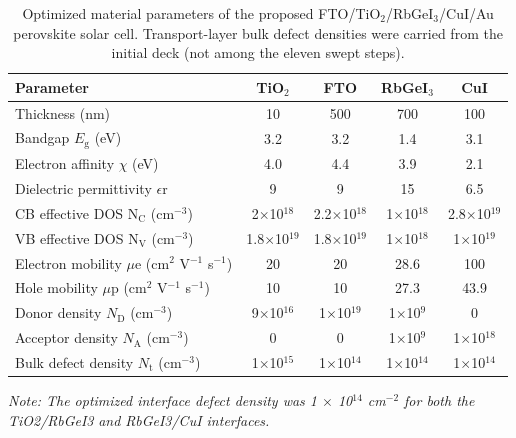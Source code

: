 \documentclass[review]{elsarticle}
\begin{document}
\begin{table}[htbp]
\centering
{\footnotesize\setlength{\tabcolsep}{3pt}
\begin{tabularx}{\textwidth}{Xcccc}
\hline
Parameter & TiO$_{2}$ & FTO & RbGeI$_{3}$ & CuI
\\\hline
Thickness (nm) & 10 & 500 & 700 & 100\\
Bandgap $E_{\mathrm{g}}$ (eV) & 3.2 & 3.2 & 1.4 & 3.1\\
Electron affinity $\chi$ (eV) & 4.0 & 4.4 & 3.9 & 2.1\\
Dielectric permittivity $\epsilon$r & 9 & 9 & 15 & 6.5\\
CB effective DOS N$_{\mathrm{C}}$ (cm$^{-3}$) & 2$\times$10$^{18}$ & 2.2$\times$10$^{18}$ & 1$\times$10$^{18}$ & 2.8$\times$10$^{19}$\\
VB effective DOS N$_{\mathrm{V}}$ (cm$^{-3}$) & 1.8$\times$10$^{19}$ & 1.8$\times$10$^{19}$ & 1$\times$10$^{18}$ & 1$\times$10$^{19}$\\
Electron mobility $\mu$e (cm$^{2}$ V$^{-1}$ s$^{-1}$) & 20 & 20 & 28.6 & 100\\
Hole mobility $\mu$p (cm$^{2}$ V$^{-1}$ s$^{-1}$) & 10 & 10 & 27.3 & 43.9\\
Donor density $N_{\mathrm{D}}$ (cm$^{-3}$) & 9$\times$10$^{16}$ & 1$\times$10$^{19}$ & 1$\times$10$^{9}$ & 0\\
Acceptor density $N_{\mathrm{A}}$ (cm$^{-3}$) & 0 & 0 & 1$\times$10$^{9}$ & 1$\times$10$^{18}$\\
Bulk defect density $N_{\mathrm{t}}$ (cm$^{-3}$) & 1$\times$10$^{15}$ & 1$\times$10$^{14}$ & 1$\times$10$^{14}$ & 1$\times$10$^{14}$\\
\hline
\end{tabularx}
}
\caption{Optimized material parameters of the proposed FTO/\allowbreak{}TiO$_{2}$/RbGeI$_{3}$/CuI/\allowbreak{}Au perovskite solar cell. Transport-layer bulk defect densities were carried from the initial deck (not among the eleven swept steps).}
\end{table}
\textit{Note: The optimized interface defect density was 1 $\times$ 10$^{14}$ cm$^{-2}$ for both the TiO}\textit{2}\textit{/RbGeI}\textit{3}\textit{ and RbGeI}\textit{3}\textit{/CuI interfaces.}
\end{document}
